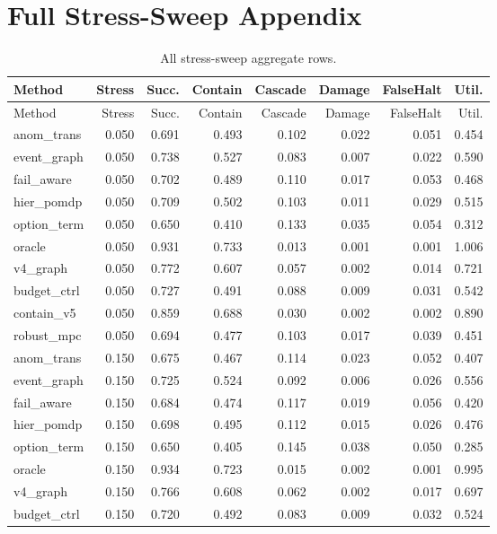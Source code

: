 \documentclass{article}
\begin{document}
\section{Full Stress-Sweep Appendix}
\begin{longtable}{@{}lrrrrrrr@{}}
\caption{All stress-sweep aggregate rows.}\\
\toprule
Method & Stress & Succ. & Contain & Cascade & Damage & FalseHalt & Util.\\
\midrule
\endfirsthead
\toprule
Method & Stress & Succ. & Contain & Cascade & Damage & FalseHalt & Util.\\
\midrule
\endhead
anom\_trans & 0.050 & 0.691 & 0.493 & 0.102 & 0.022 & 0.051 & 0.454 \\
event\_graph & 0.050 & 0.738 & 0.527 & 0.083 & 0.007 & 0.022 & 0.590 \\
fail\_aware & 0.050 & 0.702 & 0.489 & 0.110 & 0.017 & 0.053 & 0.468 \\
hier\_pomdp & 0.050 & 0.709 & 0.502 & 0.103 & 0.011 & 0.029 & 0.515 \\
option\_term & 0.050 & 0.650 & 0.410 & 0.133 & 0.035 & 0.054 & 0.312 \\
oracle & 0.050 & 0.931 & 0.733 & 0.013 & 0.001 & 0.001 & 1.006 \\
v4\_graph & 0.050 & 0.772 & 0.607 & 0.057 & 0.002 & 0.014 & 0.721 \\
budget\_ctrl & 0.050 & 0.727 & 0.491 & 0.088 & 0.009 & 0.031 & 0.542 \\
contain\_v5 & 0.050 & 0.859 & 0.688 & 0.030 & 0.002 & 0.002 & 0.890 \\
robust\_mpc & 0.050 & 0.694 & 0.477 & 0.103 & 0.017 & 0.039 & 0.451 \\
anom\_trans & 0.150 & 0.675 & 0.467 & 0.114 & 0.023 & 0.052 & 0.407 \\
event\_graph & 0.150 & 0.725 & 0.524 & 0.092 & 0.006 & 0.026 & 0.556 \\
fail\_aware & 0.150 & 0.684 & 0.474 & 0.117 & 0.019 & 0.056 & 0.420 \\
hier\_pomdp & 0.150 & 0.698 & 0.495 & 0.112 & 0.015 & 0.026 & 0.476 \\
option\_term & 0.150 & 0.650 & 0.405 & 0.145 & 0.038 & 0.050 & 0.285 \\
oracle & 0.150 & 0.934 & 0.723 & 0.015 & 0.002 & 0.001 & 0.995 \\
v4\_graph & 0.150 & 0.766 & 0.608 & 0.062 & 0.002 & 0.017 & 0.697 \\
budget\_ctrl & 0.150 & 0.720 & 0.492 & 0.083 & 0.009 & 0.032 & 0.524 \\

\end{longtable}
\end{document}
